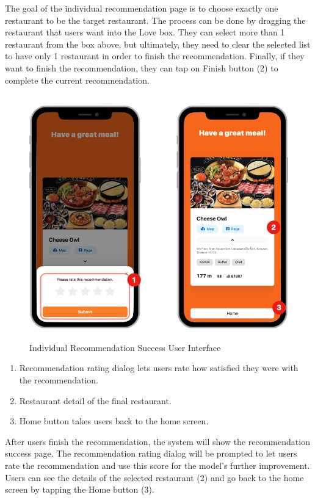 \documentclass[12pt,oneside,openright,a4paper]{cpe-english-project}
\begin{document}
The goal of the individual recommendation page is to choose exactly one restaurant to be the target restaurant. The process can be done by dragging the restaurant that users want into the Love box. They can select more than 1 restaurant from the box above, but ultimately, they need to clear the selected list to have only 1 restaurant in order to finish the recommendation. Finally, if they want to finish the recommendation, they can tap on Finish button (2) to complete the current recommendation.
\begin{figure}[H]\centering
\includegraphics[height=300pt]{./images/4ui_IndividualRecommendationSuccessUserInterface.png}
\caption{Individual Recommendation Success User Interface}\label{fig:4ui_IndividualRecommendationSuccessUserInterface}
\end{figure}

\begin{enumerate}
\item Recommendation rating dialog lets users rate how satisfied they were with the recommendation.
\item Restaurant detail of the final restaurant.
\item Home button takes users back to the home screen.
\end{enumerate}

After users finish the recommendation, the system will show the recommendation success page. The recommendation rating dialog will be prompted to let users rate the recommendation and use this score for the model's further improvement. Users can see the details of the selected restaurant (2) and go back to the home screen by tapping the Home button (3).
\end{document}
